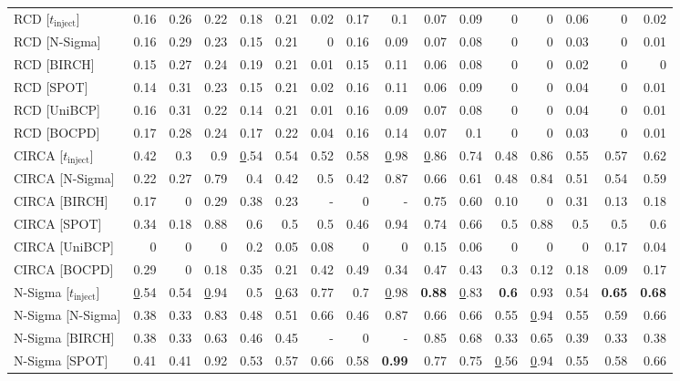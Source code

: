 \begin{table}[!t]
{\begin{tabular}{l|rrrrr|rrrrr|rrrrr}
RCD {[}$t_{\text{inject}}${]} & 0.16 & 0.26 & 0.22 & 0.18 & 0.21 & 0.02 & 0.17 & 0.1 & 0.07 & 0.09 & 0 & 0 & 0.06 & 0 & 0.02 \\
RCD {[}N-Sigma{]} & 0.16 & 0.29 & 0.23 & 0.15 & 0.21 & 0 & 0.16 & 0.09 & 0.07 & 0.08 & 0 & 0 & 0.03 & 0 & 0.01 \\
RCD {[}BIRCH{]} & 0.15 & 0.27 & 0.24 & 0.19 & 0.21 & 0.01 & 0.15 & 0.11 & 0.06 & 0.08 & 0 & 0 & 0.02 & 0 & 0 \\
RCD {[}SPOT{]} & 0.14 & 0.31 & 0.23 & 0.15 & 0.21 & 0.02 & 0.16 & 0.11 & 0.06 & 0.09 & 0 & 0 & 0.04 & 0 & 0.01 \\
RCD {[}UniBCP{]} & 0.16 & 0.31 & 0.22 & 0.14 & 0.21 & 0.01 & 0.16 & 0.09 & 0.07 & 0.08 & 0 & 0 & 0.04 & 0 & 0.01 \\
RCD {[}BOCPD{]} & 0.17 & 0.28 & 0.24 & 0.17 & 0.22 & 0.04 & 0.16 & 0.14 & 0.07 & 0.1 & 0 & 0 & 0.03 & 0 & 0.01 \\ \hline
CIRCA {[}$t_{\text{inject}}${]} & 0.42 & 0.3 & 0.9 & {\ul 0.54} & 0.54 & 0.52 & 0.58 & {\ul 0.98} & {\ul 0.86} & 0.74 & 0.48 & 0.86 & 0.55 & 0.57 & 0.62 \\
CIRCA {[}N-Sigma{]} & 0.22 & 0.27 & 0.79 & 0.4 & 0.42 & 0.5 & 0.42 & 0.87 & 0.66 & 0.61 & 0.48 & 0.84 & 0.51 & 0.54 & 0.59 \\
CIRCA {[}BIRCH{]} & 0.17 & 0 & 0.29 & 0.38 & 0.23 & - & 0 & - & 0.75 & 0.60 & 0.10 & 0 & 0.31 & 0.13 & 0.18 \\
CIRCA {[}SPOT{]} & 0.34 & 0.18 & 0.88 & 0.6 & 0.5 & 0.5 & 0.46 & 0.94 & 0.74 & 0.66 & 0.5 & 0.88 & 0.5 & 0.5 & 0.6 \\
CIRCA {[}UniBCP{]} & 0 & 0 & 0 & 0.2 & 0.05 & 0.08 & 0 & 0 & 0.15 & 0.06 & 0 & 0 & 0 & 0.17 & 0.04 \\
CIRCA {[}BOCPD{]} & 0.29 & 0 & 0.18 & 0.35 & 0.21 & 0.42 & 0.49 & 0.34 & 0.47 & 0.43 & 0.3 & 0.12 & 0.18 & 0.09 & 0.17 \\ \hline
N-Sigma {[}$t_{\text{inject}}${]} & {\ul 0.54} & 0.54 & {\ul 0.94} & 0.5 & {\ul 0.63} & 0.77 & 0.7 & {\ul 0.98} & \textbf{0.88} & {\ul 0.83} & \textbf{0.6} & 0.93 & 0.54 & \textbf{0.65} & \textbf{0.68} \\
N-Sigma {[}N-Sigma{]} & 0.38 & 0.33 & 0.83 & 0.48 & 0.51 & 0.66 & 0.46 & 0.87 & 0.66 & 0.66 & 0.55 & {\ul 0.94} & 0.55 & 0.59 & 0.66 \\
N-Sigma {[}BIRCH{]} & 0.38 & 0.33 & 0.63 & 0.46 & 0.45 & - & 0 & - & 0.85 & 0.68 & 0.33 & 0.65 & 0.39 & 0.33 & 0.38 \\
N-Sigma {[}SPOT{]} & 0.41 & 0.41 & 0.92 & 0.53 & 0.57 & 0.66 & 0.58 & \textbf{0.99} & 0.77 & 0.75 & {\ul 0.56} & {\ul 0.94} & 0.55 & 0.58 & 0.66 \\

\end{tabular}}
\end{table}
